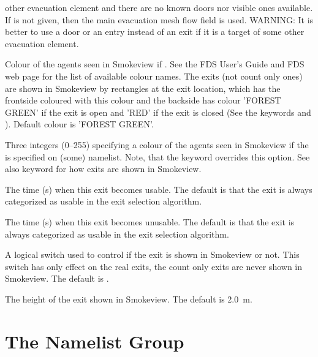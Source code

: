 \documentclass[12pt,a4paper,final,twoside]{stylevk}
\begin{document}
\begin{description}
  other evacuation element and there are no known doors nor visible
  ones available.  If  is not given, then the
  main evacuation mesh flow field is used.  WARNING: It is better to
  use a door or an entry instead of an exit if it is a target of some
  other evacuation element.
%
\item[\Timts{COLOR}] Colour of the agents seen in Smokeview if
  .  See the FDS User's Guide and FDS web page
  for the list of available colour names.  The exits (not count only
  ones) are shown in Smokeview by rectangles at the exit location,
  which has the frontside coloured with this colour and the backside
  has colour 'FOREST GREEN' if the exit is open and 'RED' if the exit
  is closed (See the keywords  and
  ).  Default colour is 'FOREST GREEN'.
%
\item[\Timts{RGB}] Three integers (0--255) specifying a colour of the
  agents seen in Smokeview if the  is specified
  on (some)  namelist.  Note, that the 
  keyword overrides this option.  See also  keyword for
  how exits are shown in Smokeview.
%
%
\item[\Timts{TIME\_OPEN}] The time (s) when this exit becomes usable.
  The default is that the exit is always categorized as usable in the
  exit selection algorithm.
%
\item[\Timts{TIME\_CLOSE}] The time (s) when this exit becomes
  unusable.  The default is that the exit is always categorized as
  usable in the exit selection algorithm.
%
\item[\Timts{SHOW}] A logical switch used to control if the exit is
  shown in Smokeview or not.  This switch has only effect on the real
  exits, the count only exits are never shown in Smokeview.  The
  default is .
%
\item[\Timts{HEIGHT}] The height of the exit shown in Smokeview.  The
  default is 2.0~m.
%
\end{description}


\section{The  Namelist Group}\label{Sec_EntrNML}
\end{document}
